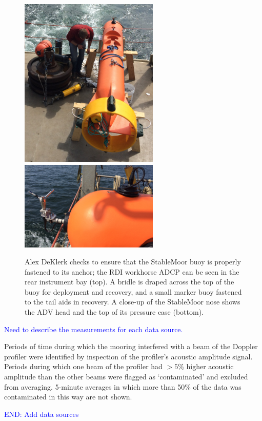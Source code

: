 \documentclass[twocol]{ametsoc}
\newcommand{\note}[1]{\textcolor{blue}{#1}}
\begin{document}
\begin{figure}[t]
  \centering
  \includegraphics[width=2.6in]{SM_ondeck01}
  \includegraphics[width=2.6in]{SM_NoseMode01}
  \caption{Alex DeKlerk checks to ensure that the StableMoor buoy is properly fastened to its anchor; the RDI workhorse ADCP can be seen in the rear instrument bay (top). A bridle is draped across the top of the buoy for deployment and recovery, and a small marker buoy fastened to the tail aids in recovery.  A close-up of the StableMoor nose shows the ADV head and the top of its pressure case (bottom). }
  \label{fig:SM}
\end{figure}

\note{Need to describe the measurements for each data source.}

Periods of time during which the mooring interfered with a beam of the Doppler profiler were identified by inspection of the profiler's acoustic amplitude signal. Periods during which one beam of the profiler had $>5\%$ higher acoustic amplitude than the other beams were flagged as `contaminated' and excluded from averaging.  5-minute averages in which more than 50\% of the data was contaminated in this way are not shown.

\note{END: Add data sources}
\end{document}
